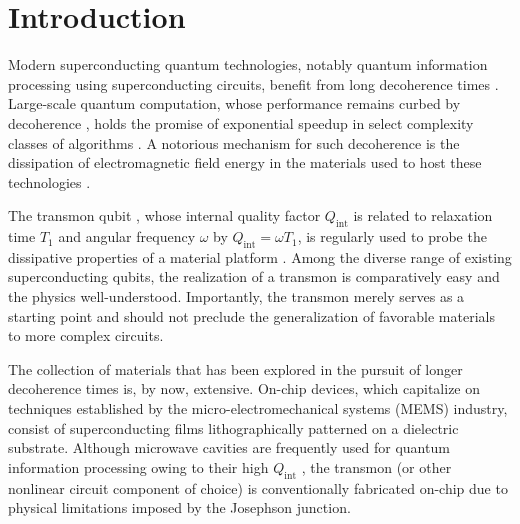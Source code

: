 \documentclass[
    reprint,
    superscriptaddress,
    amsmath,amssymb,
    aps,
    prb,
    floatfix,
]{revtex4-2}
\begin{document}
\maketitle

\section{Introduction}

Modern superconducting quantum technologies, notably quantum information processing using superconducting circuits, benefit from long decoherence times \cite{sivak2023,krinner2022,nguyen2019}. Large-scale quantum computation, whose performance remains curbed by decoherence \cite{arute2019,wu2021,zhu2022,googlequantumai2023,googlequantumaiandcollaborators2025,gao2025}, holds the promise of exponential speedup in select complexity classes of algorithms \cite{nielsen2010}. A notorious mechanism for such decoherence is the dissipation of electromagnetic field energy in the materials used to host these technologies \cite{martinis2005}.

The transmon qubit \cite{koch2007,schreier2008}, whose internal quality factor $Q_\mathrm{int}$ is related to relaxation time $T_1$ and angular frequency $\omega$ by $Q_\mathrm{int} = \omega T_1$, is regularly used to probe the dissipative properties of a material platform \cite{chang2013,place2021,bal2024,biznarova2024,bland2025}. Among the diverse range of existing superconducting qubits, the realization of a transmon is comparatively easy and the physics well-understood. Importantly, the transmon merely serves as a starting point and should not preclude the generalization of favorable materials to more complex circuits.

The collection of materials that has been explored in the pursuit of longer decoherence times is, by now, extensive. On-chip devices, which capitalize on techniques established by the micro-electromechanical systems (MEMS) industry, consist of superconducting films lithographically patterned on a dielectric substrate. Although microwave cavities are frequently used for quantum information processing owing to their high $Q_\mathrm{int}$ \cite{reagor2016,chakram2021,milul2023}, the transmon (or other nonlinear circuit component of choice) is conventionally fabricated on-chip due to physical limitations imposed by the Josephson junction.
\end{document}
